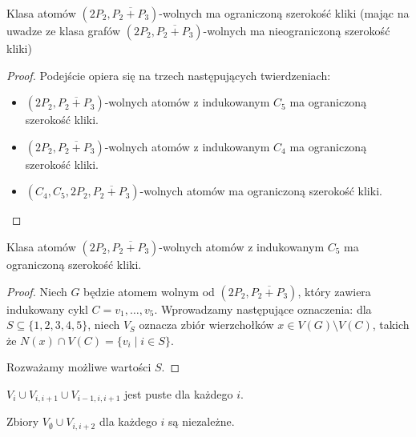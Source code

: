 \documentclass[polish]{beamer}
\begin{document}
\begin{frame}
    \begin{theorem}
        Klasa atomów $(2P_2, \overline{P_2 + P_3})$-wolnych ma ograniczoną szerokość kliki (mając na uwadze ze klasa grafów $(2P_2, \overline{P_2 + P_3})$-wolnych ma nieograniczoną szerokość kliki)
    \end{theorem}
    \begin{proof}
        \renewcommand{\qedsymbol}{}
        Podejście opiera się na trzech następujących twierdzeniach:
        \begin{itemize}
            \item $(2P_2, \overline{P_2 + P_3})$-wolnych atomów z indukowanym $C_5$ ma ograniczoną szerokość kliki.
            \item $(2P_2, \overline{P_2 + P_3})$-wolnych atomów z indukowanym $C_4$ ma ograniczoną szerokość kliki.
            \item $(C_4, C_5, 2P_2, \overline{P_2 + P_3})$-wolnych atomów ma ograniczoną szerokość kliki.
        \end{itemize}
    \end{proof}
\end{frame}

\begin{frame}
    \begin{lemma}
        Klasa atomów $(2P_2, \overline{P_2 + P_3})$-wolnych atomów z indukowanym $C_5$ ma ograniczoną szerokość kliki.
    \end{lemma}
    \begin{proof}
        \renewcommand{\qedsymbol}{}
        Niech $G$ będzie atomem wolnym od $(2P_2, \overline{P_2 + P_3})$, który zawiera indukowany cykl $C = v_1, \dots, v_5$. Wprowadzamy następujące oznaczenia: dla $S \subseteq \{1, 2, 3, 4, 5\}$, niech $V_S$ oznacza zbiór wierzchołków $x \in V(G) \setminus V(C)$, takich że $N(x) \cap V(C) = \{v_i \mid i \in S\}$.
        
        Rozważamy możliwe wartości $S$.
    \end{proof}
\end{frame}

\begin{frame}
    \begin{theorem}
        \renewcommand{\qedsymbol}{}
        $V_i \cup V_{i,i+1} \cup V_{i-1,i,i+1}$ jest puste dla każdego $i$.
    \end{theorem}
    \graphBigger
\end{frame}

\begin{frame}
    \begin{theorem}
        \renewcommand{\qedsymbol}{}
        Zbiory $V_\emptyset \cup V_{i,i+2}$ dla każdego $i$ są niezależne.
    \end{theorem}
    \graphBigger
\end{frame}
\end{document}
